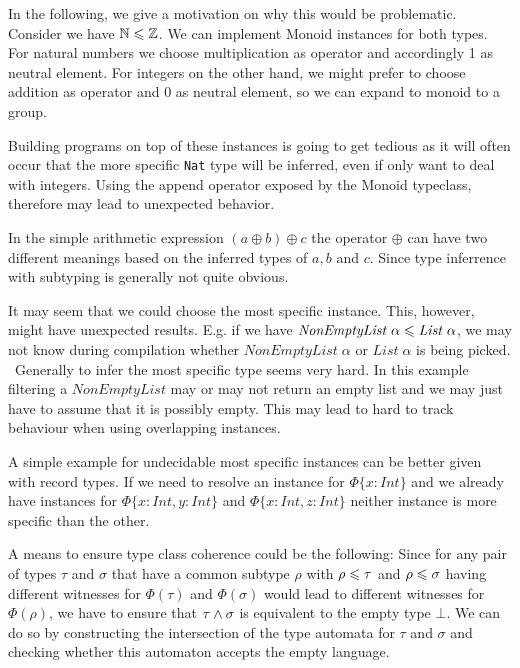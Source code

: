 In the following, we give a motivation on why this would be problematic.
Consider we have $\mathbb{N} \leqslant \mathbb{Z}$.
We can implement Monoid instances for both types. For natural numbers we choose multiplication as operator and accordingly 1 as neutral element.
For integers on the other hand, we might prefer to choose addition as operator and 0 as neutral element, so we can expand to monoid to a group.

Building programs on top of these instances is going to get tedious as it will often occur that the more specific \texttt{Nat} type will be inferred,
even if only want to deal with integers.
Using the append operator exposed by the Monoid typeclass, therefore may lead to unexpected behavior.

In the simple arithmetic expression $(a \oplus b) \oplus c$ the operator $\oplus$ can have two different meanings based on the inferred types of $a,b$ and $c$.
Since type inferrence with subtyping is generally not quite obvious.

It may seem that we could choose the most specific instance. This, however, might have unexpected results.
E.g. if we have $\mathit{NonEmptyList} \; \alpha \leqslant \mathit{List} \; \alpha$, we may not know during compilation whether $\mathit{NonEmptyList} \; \alpha $ or $\mathit{List} \; \alpha$ is being picked.
~Generally to infer the most specific type seems very hard. In this example filtering a $\mathit{NonEmptyList}$ may or may not return an empty list and we may just have to assume that it is possibly empty.
This may lead to hard to track behaviour when using overlapping instances.

A simple example for undecidable most specific instances can be better given with record types.
If we need to resolve an instance for $\Phi \{x : Int\}$ and we already have instances for $\Phi \{x : Int, y : Int\}$ and $\Phi \{x : Int, z : Int\}$ neither instance is more specific than the other.


A means to ensure type class coherence could be the following:
Since for any pair of types $\tau$ and $\sigma$ that have a common subtype $\rho$ with $\rho \leqslant \tau$ and $\rho \leqslant \sigma$ having different witnesses for $\Phi(\tau)$ and $\Phi(\sigma)$ would lead to different witnesses for $\Phi(\rho)$,
we have to ensure that $\tau \wedge \sigma$ is equivalent to the empty type $\bot$.
We can do so by constructing the intersection of the type automata for $\tau$ and $\sigma$ and checking whether this automaton accepts the empty language.

